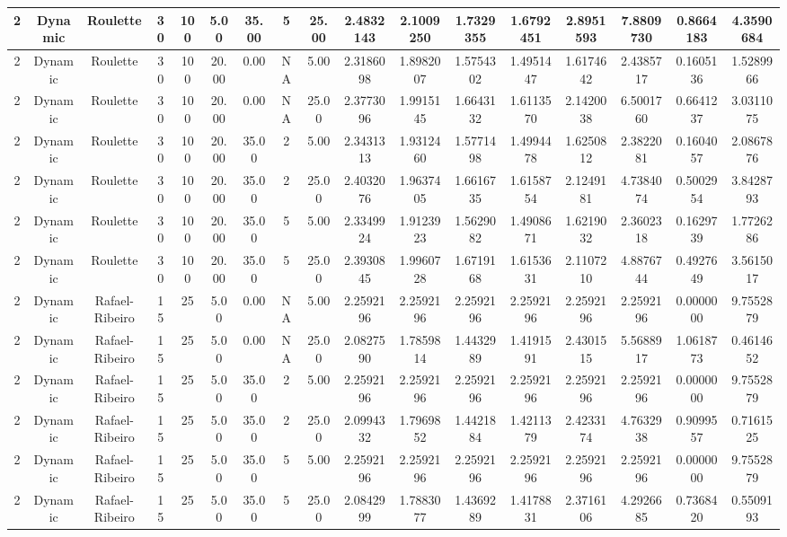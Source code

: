 \begin{longtable}{ | c | c | c | c | c | c | c | c | c | c | c | c | c | c | c | c | c | }
	\hline
	2	&	Dynamic	&	Roulette	&	30	&	100	&	5.00	&	35.00	&	5	&	25.00	&	2.4832143	&	2.1009250	&	1.7329355	&	1.6792451	&	2.8951593	&	7.8809730	&	0.8664183	&	4.3590684 \\
	\hline
	2	&	Dynamic	&	Roulette	&	30	&	100	&	20.00	&	0.00	&	NA	&	5.00	&	2.3186098	&	1.8982007	&	1.5754302	&	1.4951447	&	1.6174642	&	2.4385717	&	0.1605136	&	1.5289966 \\
	\hline
	2	&	Dynamic	&	Roulette	&	30	&	100	&	20.00	&	0.00	&	NA	&	25.00	&	2.3773096	&	1.9915145	&	1.6643132	&	1.6113570	&	2.1420038	&	6.5001760	&	0.6641237	&	3.0311075 \\
	\hline
	2	&	Dynamic	&	Roulette	&	30	&	100	&	20.00	&	35.00	&	2	&	5.00	&	2.3431313	&	1.9312460	&	1.5771498	&	1.4994478	&	1.6250812	&	2.3822081	&	0.1604057	&	2.0867876 \\
	\hline
	2	&	Dynamic	&	Roulette	&	30	&	100	&	20.00	&	35.00	&	2	&	25.00	&	2.4032076	&	1.9637405	&	1.6616735	&	1.6158754	&	2.1249181	&	4.7384074	&	0.5002954	&	3.8428793 \\
	\hline
	2	&	Dynamic	&	Roulette	&	30	&	100	&	20.00	&	35.00	&	5	&	5.00	&	2.3349924	&	1.9123923	&	1.5629082	&	1.4908671	&	1.6219032	&	2.3602318	&	0.1629739	&	1.7726286 \\
	\hline
	2	&	Dynamic	&	Roulette	&	30	&	100	&	20.00	&	35.00	&	5	&	25.00	&	2.3930845	&	1.9960728	&	1.6719168	&	1.6153631	&	2.1107210	&	4.8876744	&	0.4927649	&	3.5615017 \\
	\hline
	2	&	Dynamic	&	Rafael-Ribeiro	&	15	&	25	&	5.00	&	0.00	&	NA	&	5.00	&	2.2592196	&	2.2592196	&	2.2592196	&	2.2592196	&	2.2592196	&	2.2592196	&	0.0000000	&	9.7552879 \\
	\hline
	2	&	Dynamic	&	Rafael-Ribeiro	&	15	&	25	&	5.00	&	0.00	&	NA	&	25.00	&	2.0827590	&	1.7859814	&	1.4432989	&	1.4191591	&	2.4301515	&	5.5688917	&	1.0618773	&	0.4614652 \\
	\hline
	2	&	Dynamic	&	Rafael-Ribeiro	&	15	&	25	&	5.00	&	35.00	&	2	&	5.00	&	2.2592196	&	2.2592196	&	2.2592196	&	2.2592196	&	2.2592196	&	2.2592196	&	0.0000000	&	9.7552879 \\
	\hline
	2	&	Dynamic	&	Rafael-Ribeiro	&	15	&	25	&	5.00	&	35.00	&	2	&	25.00	&	2.0994332	&	1.7969852	&	1.4421884	&	1.4211379	&	2.4233174	&	4.7632938	&	0.9099557	&	0.7161525 \\
	\hline
	2	&	Dynamic	&	Rafael-Ribeiro	&	15	&	25	&	5.00	&	35.00	&	5	&	5.00	&	2.2592196	&	2.2592196	&	2.2592196	&	2.2592196	&	2.2592196	&	2.2592196	&	0.0000000	&	9.7552879 \\
	\hline
	2	&	Dynamic	&	Rafael-Ribeiro	&	15	&	25	&	5.00	&	35.00	&	5	&	25.00	&	2.0842999	&	1.7883077	&	1.4369289	&	1.4178831	&	2.3716106	&	4.2926685	&	0.7368420	&	0.5509193 \\

\end{longtable}
